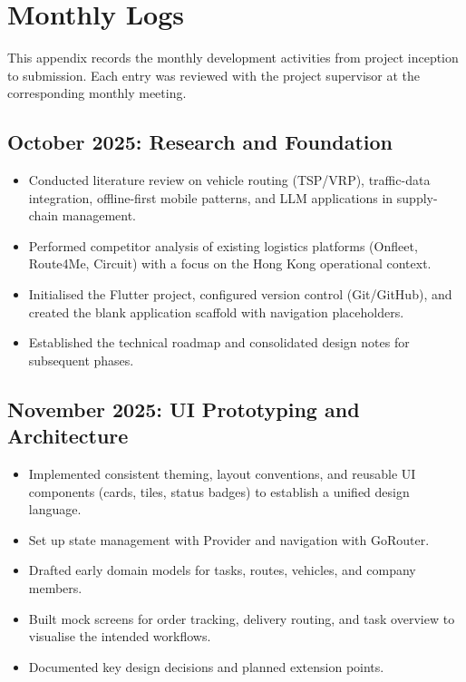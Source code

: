 ﻿%
\chapter{Monthly Logs}
\label{app:logs}

This appendix records the monthly development activities from project inception to submission.
Each entry was reviewed with the project supervisor at the corresponding monthly meeting.

\section*{October 2025: Research and Foundation}

\begin{itemize}
  \item Conducted literature review on vehicle routing (TSP/VRP), traffic-data integration,
        offline-first mobile patterns, and LLM applications in supply-chain management.
  \item Performed competitor analysis of existing logistics platforms (Onfleet, Route4Me, Circuit)
        with a focus on the Hong Kong operational context.
  \item Initialised the Flutter project, configured version control (Git/GitHub), and created
        the blank application scaffold with navigation placeholders.
  \item Established the technical roadmap and consolidated design notes for subsequent phases.
\end{itemize}

\section*{November 2025: UI Prototyping and Architecture}

\begin{itemize}
  \item Implemented consistent theming, layout conventions, and reusable UI components
        (cards, tiles, status badges) to establish a unified design language.
  \item Set up state management with Provider and navigation with GoRouter.
  \item Drafted early domain models for tasks, routes, vehicles, and company members.
  \item Built mock screens for order tracking, delivery routing, and task overview to
        visualise the intended workflows.
  \item Documented key design decisions and planned extension points.
\end{itemize}

